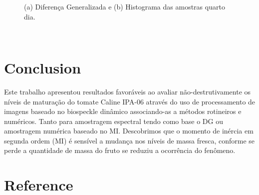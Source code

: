 \documentclass{elsarticle}
\begin{document}
\begin{figure}[h!]
\centering
{}
\qquad
{}
\qquad
\caption{(a) Diferença Generalizada e (b) Histograma das amostras quarto dia.}
\label{atividades4}
\end{figure}
\begin{figure}[h!]
\centering
{}
\qquad
{}
\label{atividades5}
\end{figure}
\\
\newpage

\section{Conclusion}
Este trabalho apresentou resultados favoráveis ao avaliar não-destrutivamente os níveis de maturação do tomate Caline IPA-06 através do uso de processamento de imagens baseado no biospeckle dinâmico associando-as a métodos rotineiros e numéricos. Tanto para amostragem espectral tendo como base o DG ou amostragem numérica baseado no MI. Descobrimos que o momento de inércia em segunda ordem (MI) é sensível a mudança nos níveis de massa fresca, conforme se perde a quantidade de massa do fruto se reduziu a ocorrência do fenômeno.


\newpage
\section{Reference}

\end{document}
